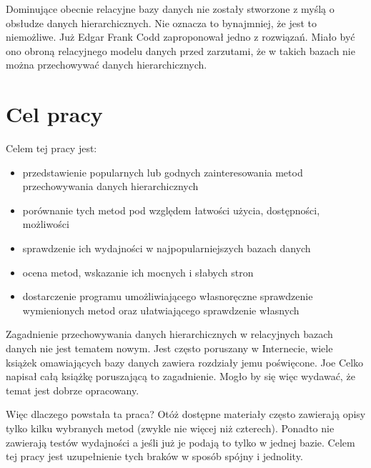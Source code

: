 Dominujące obecnie relacyjne bazy danych nie zostały stworzone z myślą o obsłudze danych hierarchicznych.
Nie oznacza to bynajmniej, że jest to niemożliwe.
Już Edgar Frank Codd zaproponował jedno z rozwiązań.
Miało być ono obroną relacyjnego modelu danych przed zarzutami,
że w takich bazach nie można przechowywać danych hierarchicznych.



\section{Cel pracy}






Celem tej pracy jest:
\begin{itemize}
    \item przedstawienie popularnych lub godnych zainteresowania metod przechowywania danych hierarchicznych
    \item porównanie tych metod pod względem łatwości użycia, dostępności, możliwości
    \item sprawdzenie ich wydajności w najpopularniejszych bazach danych
    \item ocena metod, wskazanie ich mocnych i słabych stron
    \item dostarczenie programu umożliwiającego własnoręczne sprawdzenie wymienionych metod
        oraz ułatwiającego sprawdzenie własnych
\end{itemize}


Zagadnienie przechowywania danych hierarchicznych w relacyjnych bazach danych nie jest tematem nowym.
Jest często poruszany w Internecie,
wiele książek omawiających bazy danych zawiera rozdziały jemu poświęcone.
Joe Celko napisał całą książkę poruszającą to zagadnienie\cite{celko-tree}.
Mogło by się więc wydawać, że temat jest dobrze opracowany.

Więc dlaczego powstała ta praca?
Otóż dostępne materiały często zawierają opisy tylko kilku wybranych metod (zwykle nie więcej niż czterech).
Ponadto nie zawierają testów wydajności a jeśli już je podają to tylko w jednej bazie.
Celem tej pracy jest uzupełnienie tych braków w sposób spójny i jednolity.










